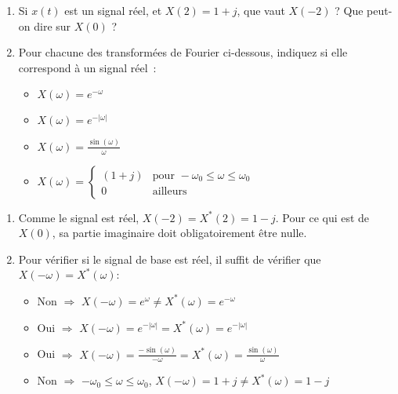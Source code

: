 \documentclass [a4paper, 11pt] {article}
\begin{document}
    \begin{exercice}{3}
        \begin{enumerate}
            \item Si $x(t)$ est un signal réel, et $X(2)=1+j$, que vaut $X(-2)$ ? Que peut-on dire sur $X(0)$ ?
            \item Pour chacune des transformées de Fourier ci-dessous, indiquez si elle correspond à un signal réel :            
            \begin{itemize}
                \item $X(\omega)=e^{-\omega}$
                \item $X(\omega)=e^{-|\omega|}$
                \item $X(\omega)=\frac{\sin(\omega)}{\omega}$
                \item $X(\omega)=\left\{\begin{array}{ll}(1+j)&\mbox{pour } -\omega_0 \leq \omega \leq \omega_0\\0&\mbox{ailleurs} \end{array}\right.$
            \end{itemize}
        \end{enumerate}

    \end{exercice}
    
    \begin{reponse}
        \begin{enumerate}
            \item Comme le signal est réel, $X(-2)=X^*(2)=1-j$. Pour ce qui est de $X(0)$, sa partie imaginaire doit obligatoirement être nulle.
            \item Pour vérifier si le signal de base est réel, il suffit de vérifier que $X(-\omega)=X^*(\omega)$:
            \begin{itemize}
                \item Non $\Rightarrow$ $X(-\omega)=e^{\omega}\ne X^*(\omega)=e^{-\omega}$
                \item Oui $\Rightarrow$ $X(-\omega)=e^{-|\omega|} = X^*(\omega)=e^{-|\omega|}$
                \item Oui $\Rightarrow$ $X(-\omega)=\frac{-\sin(\omega)}{-\omega}=X^*(\omega)=\frac{\sin(\omega)}{\omega}$
                \item Non $\Rightarrow$ $-\omega_0 \leq \omega \leq \omega_0$, $X(-\omega)=1+j\ne X^*(\omega)=1-j$
            \end{itemize}
        \end{enumerate}
    \end{reponse}
\end{document}
